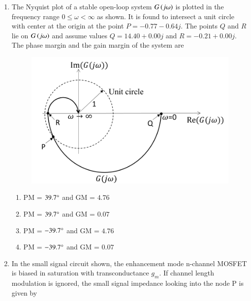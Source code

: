 \documentclass[journal,12pt,onecolumn]{IEEEtran}
\theoremstyle{remark}
\begin{document}
\begin{enumerate}
\item The Nyquist plot of a stable open-loop system $G\left(j\omega\right)$ is plotted in the frequency range $0 \le \omega < \infty$ as shown. It is found to intersect a unit circle with center at the origin at the point $P = -0.77 - 0.64j$. The points $Q$ and $R$ lie on $G\left(j\omega\right)$ and assume values $Q = 14.40 + 0.00j$ and $R = -0.21 + 0.00j$. The phase margin  and the gain margin  of the system are \underline{\hspace{2cm}}

\hfill{}
\begin{figure}[H]
\includegraphics[width = 0.5\columnwidth]{q43}
\caption*{}
\label{fig:q43}
\end{figure}
\begin{enumerate}
\item PM = $39.7\degree$ and GM = $4.76$
\item PM = $39.7\degree$ and GM = $0.07$
\item PM = $-39.7\degree$ and GM = $4.76$
\item PM = $-39.7\degree$ and GM = $0.07$
\end{enumerate}

\item In the small signal circuit shown, the enhancement mode n-channel MOSFET is biased in saturation with transconductance $g_m$. If channel length modulation is ignored, the small signal impedance looking into the node P is given by \underline{\hspace{2cm}}


\end{enumerate}
\end{document}

